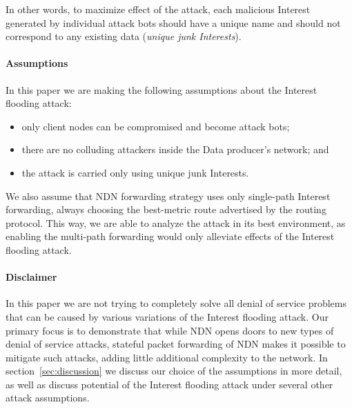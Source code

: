 In other words, to maximize effect of the attack, each malicious Interest generated by individual attack bots should have a unique name and should not correspond to any existing data (\emph{unique junk Interests}).

\paragraph{Assumptions}

In this paper we are making the following assumptions about the Interest flooding attack:
\begin{itemize}
\item only client nodes can be compromised and become attack bots;
\item there are no colluding attackers inside the Data producer's network; and
\item the attack is carried only using unique junk Interests.
\end{itemize}

We also assume that NDN forwarding strategy uses only single-path Interest forwarding, always choosing the best-metric route advertised by the routing protocol.
This way, we are able to analyze the attack in its best environment, as enabling the multi-path forwarding would only alleviate effects of the Interest flooding attack.



\paragraph{Disclaimer}

In this paper we are not trying to completely solve all denial of service problems that can be caused by various variations of the Interest flooding attack.
Our primary focus is to demonstrate that while NDN opens doors to new types of denial of service attacks, stateful packet forwarding of NDN makes it possible to mitigate such attacks, adding little additional complexity to the network.
In section~\ref{sec:discussion} we discuss our choice of the assumptions in more detail, as well as discuss potential of the Interest flooding attack under several other attack assumptions.


